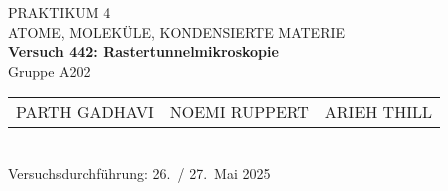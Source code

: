 \documentclass[%
paper=a4,       %
fontsize=11pt,  %
ngerman         %
]{scrreprt}
\begin{document}
\begin{titlepage}
  \centering
  \vspace*{2cm}
  
  {\Large PRAKTIKUM 4}\\[0.5cm]
  {\large ATOME, MOLEKÜLE, KONDENSIERTE MATERIE}\\[1cm]
  
  {\LARGE\bfseries Versuch 442: Rastertunnelmikroskopie}\\[1cm]
  
  Gruppe A202\\[1cm]
  
  \begin{tabular}{lll}
    PARTH GADHAVI   & NOEMI RUPPERT   & ARIEH THILL \\
  \end{tabular}\\[2cm]
  
  Versuchsdurchführung: 26.~/ 27.~Mai 2025
  
  \vfill
\end{titlepage}

\tableofcontents
\clearpage
\clearpage
\setcounter{page}{1}



\appendix
\printbibliography{}

\end{document}

